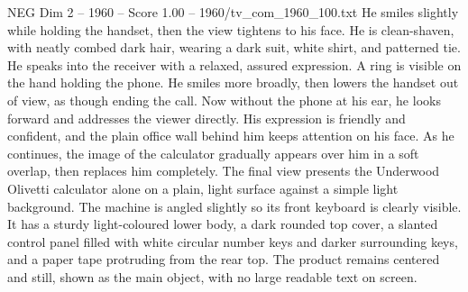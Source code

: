 \begin{textsample}{NEG Dim 2 – 1960 – Score 1.00 – 1960/tv\_com\_1960\_100.txt}
He smiles slightly while holding the handset, then the view tightens to his face.
He is clean-shaven, with neatly combed dark hair, wearing a dark suit, white shirt, and patterned tie.
He speaks into the receiver with a relaxed, assured expression.
A ring is visible on the hand holding the phone.
He smiles more broadly, then lowers the handset out of view, as though ending the call.
Now without the phone at his ear, he looks forward and addresses the viewer directly.
His expression is friendly and confident, and the plain office wall behind him keeps attention on his face.
As he continues, the image of the calculator gradually appears over him in a soft overlap, then replaces him completely.
The final view presents the Underwood Olivetti calculator alone on a plain, light surface against a simple light background.
The machine is angled slightly so its front keyboard is clearly visible.
It has a sturdy light-coloured lower body, a dark rounded top cover, a slanted control panel filled with white circular number keys and darker surrounding keys, and a paper tape protruding from the rear top.
The product remains centered and still, shown as the main object, with no large readable text on screen.

\end{textsample}
